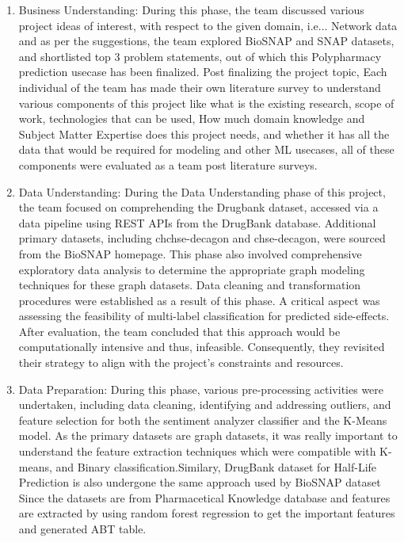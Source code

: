 \documentclass[journal,transmag]{J-NaNA}
\begin{document}
\begin{enumerate}
    \item Business Understanding: During this phase, the team discussed various project ideas of interest, with respect to the given domain, i.e... Network data and as per the suggestions, the team explored BioSNAP and SNAP datasets, and shortlisted top 3 problem statements, out of which this Polypharmacy prediction usecase has been finalized. Post finalizing the project topic, Each individual of the team has made their own literature survey to understand various components of this project like what is the existing research, scope of work, technologies that can be used, How much domain knowledge and Subject Matter Expertise does this project needs, and whether it has all the data that would be required for modeling and other ML usecases, all of these components were evaluated as a team post literature surveys.
    \item Data Understanding: During the Data Understanding phase of this project, the team focused on comprehending the Drugbank dataset, accessed via a data pipeline using REST APIs from the DrugBank database. Additional primary datasets, including chchse-decagon and chse-decagon, were sourced from the BioSNAP homepage. This phase also involved comprehensive exploratory data analysis to determine the appropriate graph modeling techniques for these graph datasets. Data cleaning and transformation procedures were established as a result of this phase. A critical aspect was assessing the feasibility of multi-label classification for predicted side-effects. After evaluation, the team concluded that this approach would be computationally intensive and thus, infeasible. Consequently, they revisited their strategy to align with the project's constraints and resources.
    \item Data Preparation: During this phase, various pre-processing activities were undertaken, including data cleaning, identifying and addressing outliers, and feature selection for both the sentiment analyzer classifier and the K-Means model. As the primary datasets are graph datasets, it was really important to understand the feature extraction techniques which were compatible with K-means, and Binary classification.Similary, DrugBank dataset for Half-Life Prediction is also undergone the same approach used by BioSNAP dataset Since the datasets are from Pharmacetical Knowledge database and features are extracted by using random forest regression to get the important features and generated ABT table.

\end{enumerate}
\end{document}
